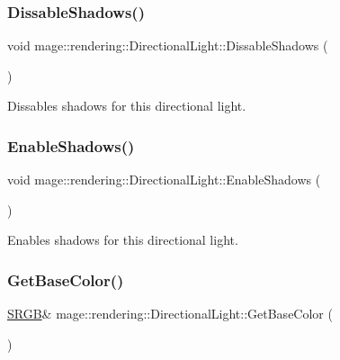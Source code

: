 \subsubsection{\texorpdfstring{Dissable\+Shadows()}{DissableShadows()}}
{\footnotesize\ttfamily void mage\+::rendering\+::\+Directional\+Light\+::\+Dissable\+Shadows (\begin{DoxyParamCaption}{ }\end{DoxyParamCaption})\hspace{0.3cm}{\ttfamily [noexcept]}}

Dissables shadows for this directional light. \hypertarget{classmage_1_1rendering_1_1_directional_light_abafdec9ce9ca0263724ce8ddba430b1b}{}\label{classmage_1_1rendering_1_1_directional_light_abafdec9ce9ca0263724ce8ddba430b1b} 
\subsubsection{\texorpdfstring{Enable\+Shadows()}{EnableShadows()}}
{\footnotesize\ttfamily void mage\+::rendering\+::\+Directional\+Light\+::\+Enable\+Shadows (\begin{DoxyParamCaption}{ }\end{DoxyParamCaption})\hspace{0.3cm}{\ttfamily [noexcept]}}

Enables shadows for this directional light. \hypertarget{classmage_1_1rendering_1_1_directional_light_aa48f4fbdc75927aa30638d5fe2cfa2f2}{}\label{classmage_1_1rendering_1_1_directional_light_aa48f4fbdc75927aa30638d5fe2cfa2f2} 
\subsubsection{\texorpdfstring{Get\+Base\+Color()}{GetBaseColor()}\hspace{0.1cm}{\footnotesize\ttfamily [1/2]}}
{\footnotesize\ttfamily \hyperlink{structmage_1_1_s_r_g_b}{S\+R\+GB}\& mage\+::rendering\+::\+Directional\+Light\+::\+Get\+Base\+Color (\begin{DoxyParamCaption}{ }\end{DoxyParamCaption})\hspace{0.3cm}{\ttfamily [noexcept]}}

